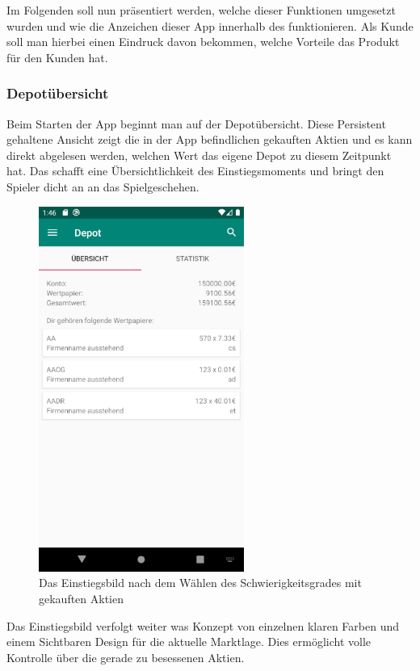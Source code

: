 \documentclass[10pt]{scrartcl}
\begin{document}
Im Folgenden soll nun präsentiert werden, welche dieser Funktionen umgesetzt wurden und wie die Anzeichen dieser App innerhalb des funktionieren. Als Kunde soll man hierbei einen Eindruck davon bekommen, welche Vorteile das Produkt für den Kunden hat. 

\subsubsection{Depotübersicht}
Beim Starten der App beginnt man auf der Depotübersicht. Diese Persistent gehaltene Ansicht zeigt die in der App befindlichen gekauften Aktien und es kann direkt abgelesen werden, welchen Wert das eigene Depot zu diesem Zeitpunkt hat. Das schafft eine Übersichtlichkeit des Einstiegsmoments und bringt den Spieler dicht an an das Spielgeschehen.

\begin{figure}[H]
	\centering
	\includegraphics[width=0.6\textwidth]{Bilder/Prsi/einstieg.png}
	\caption{Das Einstiegsbild nach dem Wählen des Schwierigkeitsgrades mit gekauften Aktien}
\end{figure}

Das Einstiegsbild verfolgt weiter was Konzept von einzelnen klaren Farben und einem Sichtbaren Design für die aktuelle Marktlage. Dies ermöglicht volle Kontrolle über die gerade zu besessenen Aktien.
								
\end{document}
